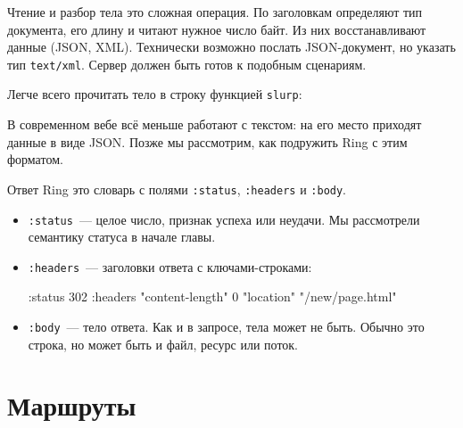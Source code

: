 
Чтение и разбор тела это сложная операция. По заголовкам определяют тип
документа, его длину и читают нужное число байт. Из них восстанавливают данные
(JSON, XML). Технически возможно послать JSON-документ, но указать тип
\verb|text/xml|. Сервер должен быть готов к подобным сценариям.

Легче всего прочитать тело в строку функцией \verb|slurp|:

\begin{english}
\end{english}

В современном вебе всё меньше работают с текстом: на его место приходят данные в
виде JSON. Позже мы рассмотрим, как подружить Ring с этим форматом.


Ответ Ring это словарь с полями \verb|:status|, \verb|:headers| и
\verb|:body|.

\begin{itemize}

\item
  \verb|:status|~--- целое число, признак успеха или неудачи. Мы рассмотрели
  семантику статуса в начале главы.

\item
  \verb|:headers|~--- заголовки ответа с ключами-строками:


\begin{english}
  \begin{clojure}
{:status 302
 :headers {"content-length" 0
           "location" "/new/page.html"}}
  \end{clojure}
\end{english}

\item
  \verb|:body|~--- тело ответа. Как и в запросе, тела может не быть. Обычно
  это строка, но может быть и файл, ресурс или поток.

\end{itemize}

\section{Маршруты}

